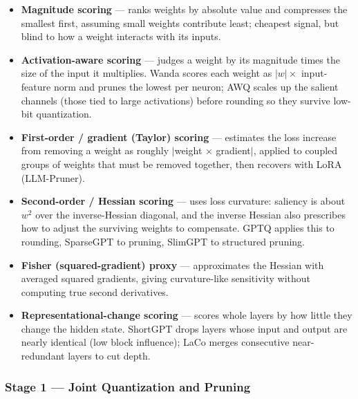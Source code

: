 \documentclass[
11pt, %
english, %
singlespacing, %
headsepline, %
]{MastersDoctoralThesis} %
\begin{document}
\begin{itemize}

  \item \textbf{Magnitude scoring} --- ranks weights by absolute value and compresses the smallest first, assuming small weights contribute least; cheapest signal, but blind to how a weight interacts with its inputs.

  \item \textbf{Activation-aware scoring} \cite{lin2024awq,sun2024wanda} --- judges a weight by its magnitude times the size of the input it multiplies. Wanda scores each weight as $|w|\times$ input-feature norm and prunes the lowest per neuron; AWQ scales up the salient channels (those tied to large activations) before rounding so they survive low-bit quantization.

  \item \textbf{First-order / gradient (Taylor) scoring} \cite{ma2023llmpruner} --- estimates the loss increase from removing a weight as roughly $|$weight $\times$ gradient$|$, applied to coupled groups of weights that must be removed together, then recovers with LoRA (LLM-Pruner).

  \item \textbf{Second-order / Hessian scoring} \cite{frantar2023gptq,frantar2023sparsegpt,ling2024slimgpt} --- uses loss curvature: saliency is about $w^2$ over the inverse-Hessian diagonal, and the inverse Hessian also prescribes how to adjust the surviving weights to compensate. GPTQ applies this to rounding, SparseGPT to pruning, SlimGPT to structured pruning.

  \item \textbf{Fisher (squared-gradient) proxy} --- approximates the Hessian with averaged squared gradients, giving curvature-like sensitivity without computing true second derivatives.

  \item \textbf{Representational-change scoring} \cite{yang2024laco,men2024shortgpt} --- scores whole layers by how little they change the hidden state. ShortGPT drops layers whose input and output are nearly identical (low block influence); LaCo merges consecutive near-redundant layers to cut depth.

\end{itemize}

\subsubsection{Stage 1 --- Joint Quantization and Pruning}
\end{document}
